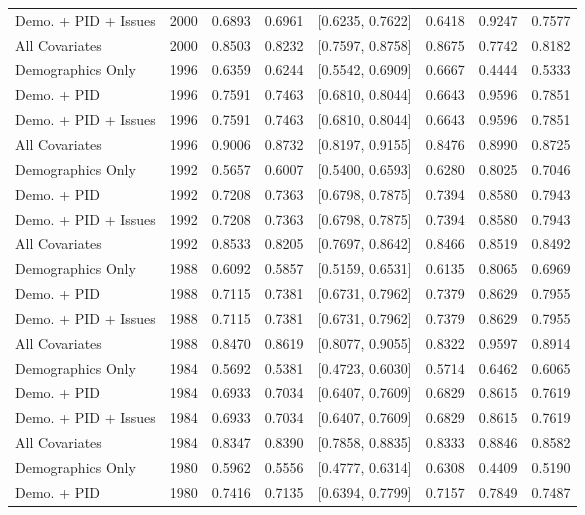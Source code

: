 \begin{longtable}{lrrrlrrr}
  Demo. + PID + Issues & 2000 & 0.6893 & 0.6961 & [0.6235, 0.7622] & 0.6418 & 0.9247 & 0.7577 \\ 
  All Covariates & 2000 & 0.8503 & 0.8232 & [0.7597, 0.8758] & 0.8675 & 0.7742 & 0.8182 \\ 
  Demographics Only & 1996 & 0.6359 & 0.6244 & [0.5542, 0.6909] & 0.6667 & 0.4444 & 0.5333 \\ 
  Demo. + PID & 1996 & 0.7591 & 0.7463 & [0.6810, 0.8044] & 0.6643 & 0.9596 & 0.7851 \\ 
  Demo. + PID + Issues & 1996 & 0.7591 & 0.7463 & [0.6810, 0.8044] & 0.6643 & 0.9596 & 0.7851 \\ 
  All Covariates & 1996 & 0.9006 & 0.8732 & [0.8197, 0.9155] & 0.8476 & 0.8990 & 0.8725 \\ 
  Demographics Only & 1992 & 0.5657 & 0.6007 & [0.5400, 0.6593] & 0.6280 & 0.8025 & 0.7046 \\ 
  Demo. + PID & 1992 & 0.7208 & 0.7363 & [0.6798, 0.7875] & 0.7394 & 0.8580 & 0.7943 \\ 
  Demo. + PID + Issues & 1992 & 0.7208 & 0.7363 & [0.6798, 0.7875] & 0.7394 & 0.8580 & 0.7943 \\ 
  All Covariates & 1992 & 0.8533 & 0.8205 & [0.7697, 0.8642] & 0.8466 & 0.8519 & 0.8492 \\ 
  Demographics Only & 1988 & 0.6092 & 0.5857 & [0.5159, 0.6531] & 0.6135 & 0.8065 & 0.6969 \\ 
  Demo. + PID & 1988 & 0.7115 & 0.7381 & [0.6731, 0.7962] & 0.7379 & 0.8629 & 0.7955 \\ 
  Demo. + PID + Issues & 1988 & 0.7115 & 0.7381 & [0.6731, 0.7962] & 0.7379 & 0.8629 & 0.7955 \\ 
  All Covariates & 1988 & 0.8470 & 0.8619 & [0.8077, 0.9055] & 0.8322 & 0.9597 & 0.8914 \\ 
  Demographics Only & 1984 & 0.5692 & 0.5381 & [0.4723, 0.6030] & 0.5714 & 0.6462 & 0.6065 \\ 
  Demo. + PID & 1984 & 0.6933 & 0.7034 & [0.6407, 0.7609] & 0.6829 & 0.8615 & 0.7619 \\ 
  Demo. + PID + Issues & 1984 & 0.6933 & 0.7034 & [0.6407, 0.7609] & 0.6829 & 0.8615 & 0.7619 \\ 
  All Covariates & 1984 & 0.8347 & 0.8390 & [0.7858, 0.8835] & 0.8333 & 0.8846 & 0.8582 \\ 
  Demographics Only & 1980 & 0.5962 & 0.5556 & [0.4777, 0.6314] & 0.6308 & 0.4409 & 0.5190 \\ 
  Demo. + PID & 1980 & 0.7416 & 0.7135 & [0.6394, 0.7799] & 0.7157 & 0.7849 & 0.7487 \\ 

\end{longtable}
